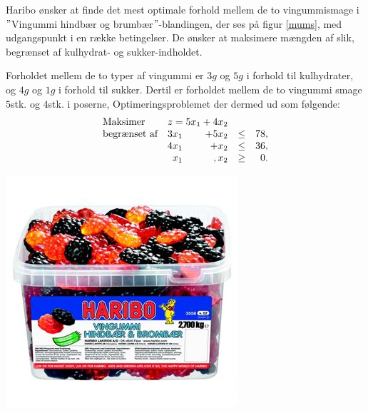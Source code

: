\begin{eks}
\label{haribooooo}
Haribo ønsker at finde det mest optimale forhold mellem de to vingummismage i $"$Vingummi hindbær og brumbær$"$-blandingen, der ses på figur \ref{mums}, med udgangspunkt i en række betingelser. 
De ønsker at maksimere mængden af slik, begrænset af kulhydrat- og sukker-indholdet.
\\
%
\begin{minipage}[b]{0.55\textwidth}
%
Forholdet mellem de to typer af vingummi er $3 g$ og $5 g$ i forhold til kulhydrater, og $4 g$ og $1 g$ i forhold til sukker. 
Dertil er forholdet mellem de to vingummi smage $5$stk. og $4$stk. i poserne, 
Optimeringsproblemet der dermed ud som følgende:
%
\begin{align*}
\begin{array}{lrrlr}
\text{Maksimer}		&	\multicolumn{2}{c}{z=5x_1+4x_2}  &\\
\text{begrænset af}	&3x_1& +5x_2			&\leq 	&78,\\
					&4x_1& + x_2				&\leq	& 36,\\
					&x_1& , x_2				&\geq	& 0.
\end{array}
\end{align*}
%
\end{minipage}
%
\begin{minipage}[b]{0.4\textwidth}
%
\center
\includegraphics[scale=0.7]{fig/img/hindbaerbrombaer}
%
\label{mums}
\end{minipage}
%
\end{eks}

